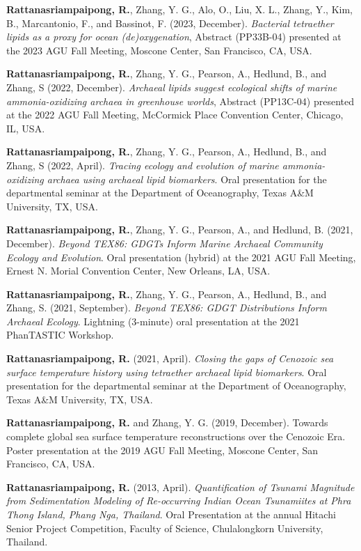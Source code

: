 \documentclass[10pt, letter]{article}
\newcommand{\myname}[1]{\textbf{Rattanasriampaipong, R.}}
\begin{document}
\begin{etaremune}
\item {\myname{rattanasriampaipong}}, Zhang, Y. G., Alo, O., Liu, X. L., Zhang, Y., Kim, B., Marcantonio, F., and Bassinot, F. (2023, December). \textit{Bacterial tetraether lipids as a proxy for ocean (de)oxygenation}, Abstract (PP33B-04) presented at the 2023 AGU Fall Meeting, Moscone Center, San Francisco, CA, USA.

\item {\myname{rattanasriampaipong}}, Zhang, Y. G., Pearson, A., Hedlund, B., and Zhang, S (2022, December). \textit{Archaeal lipids suggest ecological shifts of marine ammonia-oxidizing archaea in greenhouse worlds}, Abstract (PP13C-04) presented at the 2022 AGU Fall Meeting, McCormick Place Convention Center, Chicago, IL, USA.

\item {\myname{rattanasriampaipong}}, Zhang, Y. G., Pearson, A., Hedlund, B., and Zhang, S (2022, April). \textit{Tracing ecology and evolution of marine ammonia-oxidizing archaea using archaeal lipid biomarkers}. Oral presentation for the departmental seminar at the Department of Oceanography, Texas A\&M University, TX, USA.

\item {\myname{rattanasriampaipong}}, Zhang, Y. G., Pearson, A., and Hedlund, B. (2021, December). \textit{Beyond TEX86: GDGTs Inform Marine Archaeal Community Ecology and Evolution}. Oral presentation (hybrid) at the 2021 AGU Fall Meeting, Ernest N. Morial Convention Center, New Orleans, LA, USA.

\item {\myname{rattanasriampaipong}}, Zhang, Y. G., Pearson, A., Hedlund, B., and Zhang, S. (2021, September). \textit{Beyond TEX86: GDGT Distributions Inform Archaeal Ecology}. Lightning (3-minute) oral presentation at the 2021 PhanTASTIC Workshop.

\item {\myname{rattanasriampaipong}} (2021, April). \textit{Closing the gaps of Cenozoic sea surface temperature history using tetraether archaeal lipid biomarkers}. Oral presentation for the departmental seminar at the Department of Oceanography, Texas A\&M University, TX, USA.

\item {\myname{rattanasriampaipong}} and Zhang, Y. G. (2019, December). Towards complete global sea surface temperature reconstructions over the Cenozoic Era. Poster presentation at the 2019 AGU Fall Meeting, Moscone Center, San Francisco, CA, USA.

\item {\myname{rattanasriampaipong}} (2013, April). \textit{Quantification of Tsunami Magnitude from Sedimentation Modeling of Re-occurring Indian Ocean Tsunamiites at Phra Thong Island, Phang Nga, Thailand}. Oral Presentation at the annual Hitachi Senior Project Competition, Faculty of Science, Chulalongkorn University, Thailand.
\end{etaremune}
\end{document}
